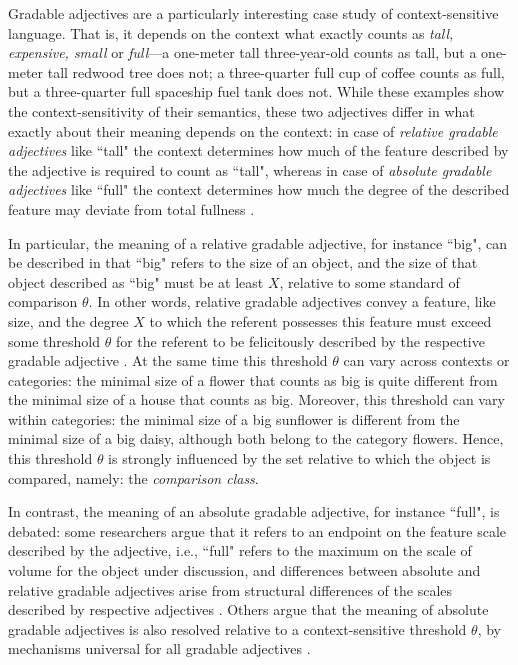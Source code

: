 Gradable adjectives are a particularly interesting case study of context-sensitive language. That is, it depends on the context what exactly counts as \textit{tall, expensive, small} or \textit{full}---a one-meter tall three-year-old counts as tall, but a one-meter tall redwood tree does not; a three-quarter full cup of coffee counts as full, but a three-quarter full spaceship fuel tank does not. While these examples show the context-sensitivity of their semantics, these two adjectives differ in what exactly about their meaning depends on the context: in case of \textit{relative gradable adjectives} like ``tall" the context determines how much of the feature described by the adjective is required to count as ``tall", whereas in case of \textit{absolute gradable adjectives} like ``full" the context determines how much the degree of the described feature may deviate from total fullness \parencite{Aparicio2016, Kennedy2007, hofherr2010adjectives}.  

In particular, the meaning of a relative gradable adjective, for instance ``big", can be described in that ``big" refers to the size of an object, and the size of that object  described as ``big" must be at least $X$, relative to some standard of comparison $\theta$. In other words, relative gradable adjectives convey a feature, like size, and the degree $X$ to which the referent possesses this feature must exceed some threshold $\theta$ for the referent to be felicitously described by the respective gradable adjective \parencite[e.g.,][]{Kennedy2007}. At the same time this threshold $\theta$ can vary across contexts or categories: the minimal size of a flower that counts as big is quite different from the minimal size of a house that counts as big. Moreover, this threshold can vary within categories: the minimal size of a big sunflower is different from the minimal size of a big daisy, although both belong to the category flowers. Hence, this threshold $\theta$ is strongly influenced by the set relative to which the object is compared, namely: the \textit{comparison class}.

In contrast, the meaning of an absolute gradable adjective, for instance ``full", is debated: some researchers argue that it refers to an endpoint on the feature scale described by the adjective, i.e., ``full" refers to the maximum on the scale of volume for the object under discussion, and differences between absolute and relative gradable adjectives arise from structural differences of the scales described by respective adjectives \parencite{Kennedy2007, Aparicio2016, Qing2014}. Others argue that the meaning of absolute gradable adjectives is also resolved relative to a context-sensitive threshold $\theta$, by mechanisms universal for all gradable adjectives \parencite{lassiter2017adjectival}.

